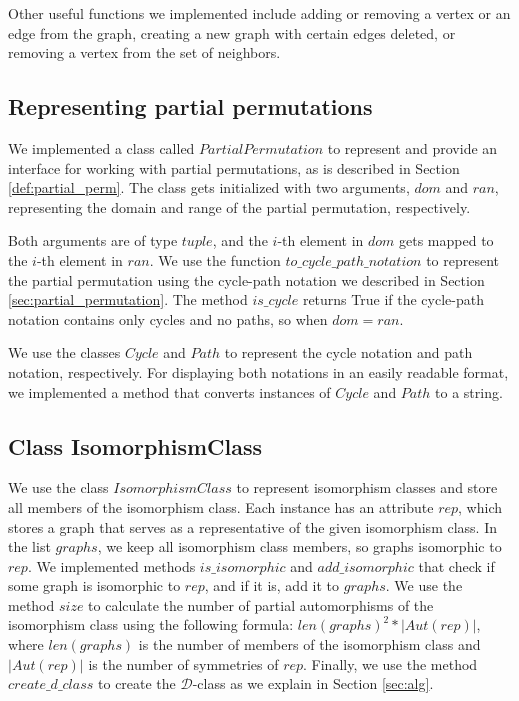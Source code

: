 Other useful functions we implemented include adding or removing a vertex or an edge from the graph, creating a new graph with certain edges deleted, or removing a vertex from the set of neighbors.

\subsection{Representing partial permutations}

We implemented a class called $PartialPermutation$ to represent and provide an interface for working with partial permutations, as is described in Section \ref{def:partial_perm}. The class gets initialized with two arguments, $dom$ and $ran$, representing the domain and range of the partial permutation, respectively.

Both arguments are of type $tuple$, and the $i$-th element in $dom$ gets mapped to the $i$-th element in $ran$. We use the function $to\_cycle\_path\_notation$ to represent the partial permutation using the cycle-path notation we described in Section \ref{sec:partial_permutation}. The method $is\_cycle$ returns True if the cycle-path notation contains only cycles and no paths, so when $dom = ran$.

We use the classes $Cycle$ and $Path$ to represent the cycle notation and path notation, respectively. For displaying both notations in an easily readable format, we implemented a method that converts instances of $Cycle$ and $Path$ to a string.

\subsection{Class IsomorphismClass}

We use the class $IsomorphismClass$ to represent isomorphism classes and store all members of the isomorphism class. Each instance has an attribute $rep$, which stores a graph that serves as a representative of the given isomorphism class. In the list $graphs$, we keep all isomorphism class members, so graphs isomorphic to $rep$. We implemented methods $is\_isomorphic$ and $add\_isomorphic$ that check if some graph is isomorphic to $rep$, and if it is, add it to $graphs$. We use the method $size$ to calculate the number of partial automorphisms of the isomorphism class using the following formula: $len(graphs)^2 * |Aut(rep)|$, where $len(graphs)$ is the number of members of the isomorphism class and $|Aut(rep)|$ is the number of symmetries of $rep$. Finally, we use the method $create\_d\_class$ to create the $\mathcal{D}$-class as we explain in Section \ref{sec:alg}.


